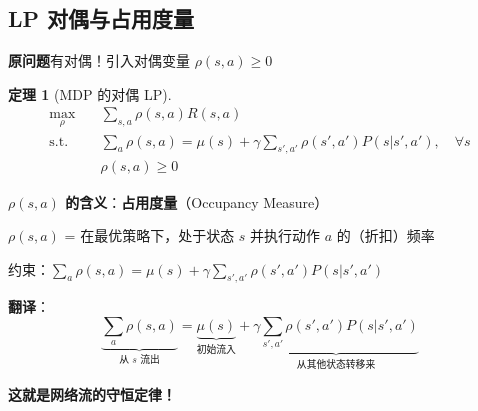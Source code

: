\documentclass[12pt, a4paper]{ctexart}
\newtheorem{theorem}{定理}[section]
\begin{document}
\subsection{LP 对偶与占用度量}

\begin{blackboard}

\textbf{原问题}有对偶！引入对偶变量 $\rho(s, a) \geq 0$

\begin{theorem}[MDP 的对偶 LP]
\[
\begin{aligned}
\max_\rho \quad & \sum_{s,a} \rho(s,a) R(s,a) \\
\text{s.t.} \quad & \sum_a \rho(s,a) = \mu(s) + \gamma \sum_{s',a'} \rho(s',a') P(s|s',a'), \quad \forall s \\
& \rho(s,a) \geq 0
\end{aligned}
\]
\end{theorem}

\textbf{$\rho(s,a)$ 的含义}：\textbf{占用度量}（Occupancy Measure）

$\rho(s,a)$ = 在最优策略下，处于状态 $s$ 并执行动作 $a$ 的（折扣）频率

\end{blackboard}

\begin{blackboard}

约束：$\sum_a \rho(s,a) = \mu(s) + \gamma \sum_{s',a'} \rho(s',a') P(s|s',a')$

\textbf{翻译}：
\[
\underbrace{\sum_a \rho(s,a)}_{\text{从 } s \text{ 流出}} = \underbrace{\mu(s)}_{\text{初始流入}} + \underbrace{\gamma \sum_{s',a'} \rho(s',a') P(s|s',a')}_{\text{从其他状态转移来}}
\]

\begin{center}
\end{center}

\textbf{这就是网络流的守恒定律！}

\end{blackboard}
\end{document}
